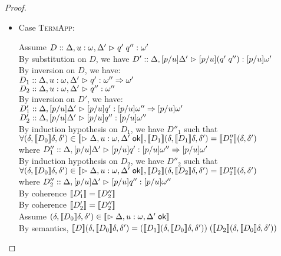 \begin{proof}
\begin{enumerate}
\begin{itemize}
  \item Case \textsc{TermApp}: 
    \begin{tabbedproof}
      \oo Assume $D :: \judgeA[{\Delta, u:\omega, \Delta'}]{q'\;q''}{\omega'}$ \\
      \ooo By substitution on $D$, we have $D' :: \judgeA[{\Delta, [p/u]\Delta'}]{[p/u](q'\;q'')}{[p/u]\omega'}$ \\
      \ooo By inversion on $D$, we have: \\
      \oooo $D_1 :: \judgeA[{\Delta, u:\omega, \Delta'}]{q'}{\omega'' \To \omega'}$ \\
      \oooo $D_2 :: \judgeA[{\Delta, u:\omega, \Delta'}]{q''}{\omega''}$ \\
      \ooo By inversion on $D'$, we have: \\
      \oooo $D'_1 :: \judgeA[{\Delta, [p/u]\Delta'}]{[p/u]q'}{[p/u]\omega'' \To [p/u]\omega'}$ \\
      \oooo $D'_2 :: \judgeA[{\Delta, [p/u]\Delta'}]{[p/u]q''}{[p/u]\omega''}$ \\
      \ooo By induction hypothesis on $D_1$, we have $D''_1$ such that \\
      \ooox $\forall (\delta, \interp{D_0}\delta, \delta') \in \interp{\judgeACtx{\Delta, u:\omega, \Delta'}}, \interp{D_1}(\delta, \interp{D_1}\delta, \delta') = \interp{D''_1}(\delta,\delta')$\\
      \ooox where $D''_1 :: \judgeA[{\Delta, [p/u]\Delta'}]{[p/u]q'}{[p/u]\omega'' \To [p/u]\omega'}$ \\
      \ooo By induction hypothesis on $D_2$, we have $D''_2$ such that \\
      \ooox $\forall (\delta, \interp{D_0}\delta, \delta') \in \interp{\judgeACtx{\Delta, u:\omega, \Delta'}}, \interp{D_2}(\delta, \interp{D_2}\delta, \delta') = \interp{D''_2}(\delta,\delta')$\\
      \ooox where $D''_2 :: \judgeA[{\Delta, [p/u]\Delta'}]{[p/u]q''}{[p/u]\omega''}$ \\
      \ooo By coherence $\interp{D'_1} = \interp{D''_2}$ \\
      \ooo By coherence $\interp{D'_2} = \interp{D''_2}$ \\
      \ooo Assume $(\delta, \interp{D_0}\delta, \delta') \in 
                   \interp{\judgeACtx{\Delta, u:\omega, \Delta'}}$ \\
      \oooo By semantics, $\interp{D}(\delta, \interp{D_0}\delta, \delta') = 
             (\interp{D_1}(\delta, \interp{D_0}\delta, \delta'))\;
             (\interp{D_2}(\delta, \interp{D_0}\delta, \delta'))$ \\

\end{tabbedproof}
\end{itemize}
\end{enumerate}
\end{proof}
